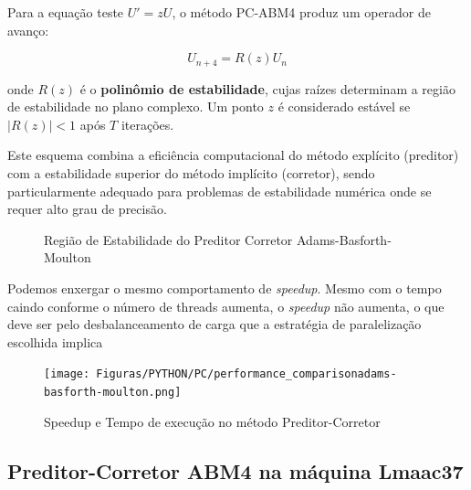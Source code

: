\documentclass[a4paper,12pt]{article}
\begin{document}
Para a equação teste $U' = zU$, o método PC-ABM4 produz um operador de avanço:

\[
U_{n+4} = R(z)U_n
\]

onde $R(z)$ é o \textbf{polinômio de estabilidade}, cujas raízes determinam a região de estabilidade no plano complexo. Um ponto $z$ é considerado estável se $|R(z)| < 1$ após $T$ iterações.

Este esquema combina a eficiência computacional do método explícito (preditor) com a estabilidade superior do método implícito (corretor), sendo particularmente adequado para problemas de estabilidade numérica onde se requer alto grau de precisão.


\begin{figure}[H]
	\centering
	
	
	\vspace{0.5cm}
	
	
	\caption{Região de Estabilidade do Preditor Corretor Adams-Basforth-Moulton}
	\label{fig:pre-cor-all}
\end{figure}


Podemos enxergar o mesmo comportamento de \textit{speedup}. Mesmo com o tempo caindo conforme o número de threads aumenta, o \textit{speedup} não aumenta, o que deve ser pelo desbalanceamento de carga que a estratégia de paralelização escolhida implica 

\begin{figure}[H]
   \centering
   \texttt{[image: Figuras/PYTHON/PC/performance\_comparisonadams-basforth-moulton.png]}
   \caption{Speedup e Tempo de execução no método Preditor-Corretor}
   \label{fig:speed_threads_PC4}
\end{figure}

\subsection{Preditor-Corretor ABM4 na máquina Lmaac37}
\end{document}
